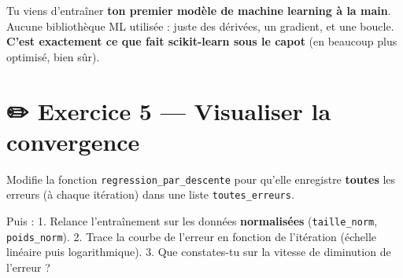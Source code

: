 \documentclass[
  french,
  11pt,
  a4paper,
]{scrbook}
\begin{document}
\begin{tcolorbox}[enhanced jigsaw, arc=.35mm, bottomrule=.15mm, bottomtitle=1mm, breakable, colback=white, colbacktitle=quarto-callout-important-color!10!white, colframe=quarto-callout-important-color-frame, coltitle=black, left=2mm, leftrule=.75mm, opacityback=0, opacitybacktitle=0.6, rightrule=.15mm, title=\textcolor{quarto-callout-important-color}{\faExclamation}\hspace{0.5em}{🎉 Ce que tu viens d'accomplir}, titlerule=0mm, toprule=.15mm, toptitle=1mm]

Tu viens d'entraîner \textbf{ton premier modèle de machine learning à la
main}. Aucune bibliothèque ML utilisée : juste des dérivées, un
gradient, et une boucle. \textbf{C'est exactement ce que fait
scikit-learn sous le capot} (en beaucoup plus optimisé, bien sûr).

\end{tcolorbox}

\section{✏️ Exercice 5 --- Visualiser la
convergence}\label{exercice-5-visualiser-la-convergence}

\begin{tcolorbox}[enhanced jigsaw, arc=.35mm, bottomrule=.15mm, bottomtitle=1mm, breakable, colback=white, colbacktitle=quarto-callout-note-color!10!white, colframe=quarto-callout-note-color-frame, coltitle=black, left=2mm, leftrule=.75mm, opacityback=0, opacitybacktitle=0.6, rightrule=.15mm, title={📝 Énoncé}, titlerule=0mm, toprule=.15mm, toptitle=1mm]

Modifie la fonction \texttt{regression\_par\_descente} pour qu'elle
enregistre \textbf{toutes} les erreurs (à chaque itération) dans une
liste \texttt{toutes\_erreurs}.

Puis : 1. Relance l'entraînement sur les données \textbf{normalisées}
(\texttt{taille\_norm}, \texttt{poids\_norm}). 2. Trace la courbe de
l'erreur en fonction de l'itération (échelle linéaire puis
logarithmique). 3. Que constates-tu sur la vitesse de diminution de
l'erreur ?

\end{tcolorbox}
\end{document}
